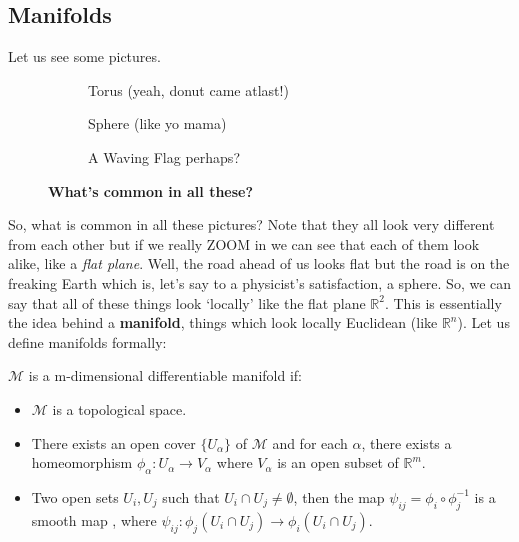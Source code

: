 \subsection{Manifolds}
Let us see some pictures. 
\begin{figure}[H]
  \centering

  \begin{subfigure}[b]{0.3\textwidth}
    \centering
    
    \caption{Torus (yeah, donut came atlast!)}
  \end{subfigure}
  \hfill
  \begin{subfigure}[b]{0.3\textwidth}
    \centering
    
    \caption{Sphere (like yo mama)}
  \end{subfigure}
  \hfill
  \begin{subfigure}[b]{0.3\textwidth}
    \centering
    
    \caption{A Waving Flag perhaps?}
  \end{subfigure}

  \caption{\textbf{What's common in all these?}}
\end{figure}
\noindent
So, what is common in all these pictures? Note that they all look very different from each other but if we really ZOOM in  we can see that each of them look alike, like a \textit{flat plane}. Well, the road ahead of us looks flat but the road is on the freaking Earth which is, let's say to a physicist's satisfaction, a sphere. So, we can say that all of these things look `locally' like the flat plane $\mathbb{R}^2$. This is essentially the idea behind a \textbf{manifold}, things which look locally Euclidean (like $\mathbb{R}^n$). Let us define manifolds formally:
\begin{definition}
  $\mathcal{M}$ is a m-dimensional differentiable manifold if:
  \begin{itemize}
    \item $\mathcal{M}$ is a topological space.
    \item There exists an open cover $\{U_\alpha\}$ of $\mathcal{M}$ and for each $\alpha$, there exists a homeomorphism $\phi_\alpha: U_\alpha \to V_\alpha$ where $V_\alpha$ is an open subset of $\mathbb{R}^m$.
    \item Two open sets $U_i, U_j$ such that $U_i \cap U_j \neq \emptyset$, then the map $\psi_{ij} = \phi_i \circ \phi_j^{-1}$ is a smooth map \footnotemark, where $\psi_{ij}: \phi_j(U_i \cap U_j) \to \phi_i(U_i \cap U_j)$.
  \end{itemize}
\end{definition}
